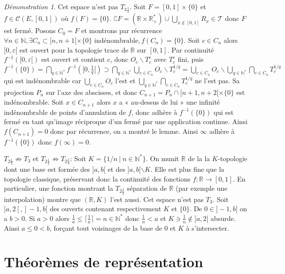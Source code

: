 \documentclass[a4paper, 11pt, french]{book}
\newenvironment{itemise}{\itemize}{\enditemize}
\theoremstyle{plain} %
\theoremstyle{definition} %
\theoremstyle{remark} %
\newtheorem*{demonstration}{Démonstration}
\renewcommand{\setminus}{\backslash}
\newcommand{\1}{\mathds{1}}
\newcommand{\inv}[1]{#1^{-1}}
\newcommand{\N}{\mathbb{N}}
\newcommand{\R}{\mathbb{R}}
\renewcommand{\cal}[1]{\mathcal{#1}}
\newcommand{\scr}[1]{\mathscr{#1}}
\newcommand\ens[2]{\{#1 \ |\ #2\}}
\begin{document}
\begin{demonstration}
\begin{itemise}
		Cet espace n'est pas $T_{3\frac{1}{2}}$.
		Soit $F=[0, 1]\times\{0\}$ et $f\in\cal{C}(E, [0, 1])$ où $f(F)=\{0\}$.
		$\complement F=(\R\times\R_+^*)\cup\bigcup_{x\notin[0, 1]}R_x\in\scr{T}$ donc $F$ est fermé.
		Posons $C_0=F$ et montrons par récurrence $\forall n\in\N, \exists C_n\subset [n, n+1[\times\{0\}\text{ indénombrable}, f(C_n)=\{0\}$.
		Soit $c\in C_n$ alors $[0, \varepsilon[$ est ouvert pour la topologie trace de $\R$ sur $[0, 1]$.
		Par continuité $\inv{f}([0, \varepsilon[)$ est ouvert et contient $c$, donc $O_c\setminus T_c^\varepsilon$ avec $T_c^\varepsilon$ fini, puis $\inv{f}(\{0\})=\bigcap_{q\in\N^*}\inv{f}([0,\frac{1}{q}[)\supset\bigcap_{q\in\N^*}\bigcup_{c\in C_n}O_c\setminus T_c^{1/q}=\bigcup_{c\in C_n}O_c\setminus\bigcup_{q\in\N^*}\bigcap_{c\in C_n}T_c^{1/q}$ qui est indénombrable car $\bigcup_{c\in C_n}O_c$ l'est et $\bigcup_{q\in\N^*}\bigcap_{c\in C_n}T_c^{1/q}$ ne l'est pas.
		Sa projection $P_n$ sur l'axe des abscisses, et donc $C_{n+1}=P_n\cap[n+1, n+2[\times\{0\}$ est indénombrable.
		Soit $x\in C_{n+1}$ alors $x$ a « au-dessus de lui » une infinité indénombrable de points d'annulation de $f$, donc adhère à $\inv{f}(\{0\})$ qui est fermé en tant qu'image réciproque d'un fermé par une application continue.
		Ainsi $f(C_{n+1})=0$ donc par récurrence, on a montré le lemme.
		Ainsi $\infty$ adhère à $\inv{f}(\{0\})$ donc $f(\infty)=0$.
		\item[$T_{2\frac{1}{2}}\not\Rightarrow T_3$ et $T_{2\frac{1}{2}}\not\Rightarrow T_{2\frac{3}{4}}$:]
		Soit $K=\ens{1/n}{n\in\N^*}$.
		On munit $\R$ de la la $K$-topologie dont une base est formée des $]a, b[$ et des $]a, b[\setminus K$.
		Elle est plus fine que la topologie classique, préservant donc la continuité des fonctions $f:\R\rightarrow[0, 1]$.
		En particulier, une fonction montrant la $T_{2\frac{3}{4}}$ séparation de $\R$ (par exemple une interpolation) montre que $(\R, K)$ l'est aussi.
		Cet espace n'est pas $T_3$.
		Soit $]a, 2[, ]-1, b[$ des ouverts contenant respectivement $K$ et $\{0\}$.
		De $0\in]-1, b[$ on a $b>0$.
		Si $a>0$ alors $\frac{1}{a}\leqslant \lceil\frac{1}{a}\rceil=n\in\N^*$ donc $\frac{1}{n}<a$ et $K\ni\frac{1}{n}\notin]a, 2[$ absurde.
		Ainsi $a\leqslant0<b$, forçant tout voisinages de la base de $0$ et $K$ à s'intersecter.
	\end{itemise}
\end{demonstration}

\section{Théorèmes de représentation}
\end{document}
